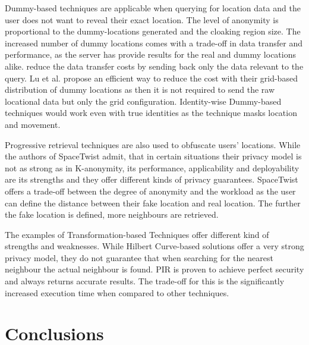 \documentclass[english]{tktltiki2}
\theoremstyle{definition}
\theoremstyle{remark}
\begin{document}
Dummy-based techniques are applicable when querying for location data and the user does not want to reveal their exact location. The level of anonymity is proportional to the dummy-locations generated and the cloaking region size. The increased number of dummy locations comes with a trade-off in data transfer and performance, as the server has provide results for the real and dummy locations alike. \cite{Kido2005} reduce the data transfer costs by sending back only the data relevant to the query. Lu et al. propose an efficient way to reduce the cost with their grid-based distribution of dummy locations as then it is not required to send the raw locational data but only the grid configuration. Identity-wise Dummy-based techniques would work even with true identities as the technique masks location and movement.\par
Progressive retrieval techniques are also used to obfuscate users' locations. While the authors of SpaceTwist\cite{SpaceTwist} admit, that in certain situations their privacy model is not as strong as in K-anonymity, its performance, applicability and deployability are its strengths and they offer different kinds of privacy guarantees. SpaceTwist offers a trade-off between the degree of anonymity and the workload as the user can define the distance between their fake location and real location. The further the fake location is defined, more neighbours are retrieved. \par 
The examples of Transformation-based Techniques offer different kind of strengths and weaknesses. While Hilbert Curve-based solutions \cite{Hilbert, Um2010} offer a very strong privacy model, they do not guarantee that when searching for the nearest neighbour the actual neighbour is found. PIR \cite{Ghinita2008} is proven to achieve perfect security and always returns accurate results. The trade-off for this is the significantly increased execution time when compared to other techniques.
 

\section{Conclusions}

%
%
% 
%







% 
\end{document}
